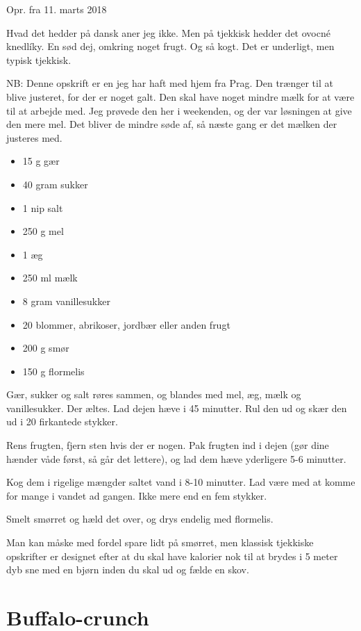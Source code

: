 \documentclass[
  letterpaper,
  DIV=11,
  numbers=noendperiod]{scrreprt}
\providecommand{\tightlist}{%
  \setlength{\itemsep}{0pt}\setlength{\parskip}{0pt}}\usepackage{longtable,booktabs,array}
\begin{document}
Opr. fra 11. marts 2018

Hvad det hedder på dansk aner jeg ikke. Men på tjekkisk hedder det
ovocné knedlíky. En sød dej, omkring noget frugt. Og så kogt. Det er
underligt, men typisk tjekkisk.

NB: Denne opskrift er en jeg har haft med hjem fra Prag. Den trænger til
at blive justeret, for der er noget galt. Den skal have noget mindre
mælk for at være til at arbejde med. Jeg prøvede den her i weekenden, og
der var løsningen at give den mere mel. Det bliver de mindre søde af, så
næste gang er det mælken der justeres med.

\begin{itemize}
\tightlist
\item
  15 g gær
\item
  40 gram sukker
\item
  1 nip salt
\item
  250 g mel
\item
  1 æg
\item
  250 ml mælk
\item
  8 gram vanillesukker
\item
  20 blommer, abrikoser, jordbær eller anden frugt
\item
  200 g smør
\item
  150 g flormelis
\end{itemize}

Gær, sukker og salt røres sammen, og blandes med mel, æg, mælk og
vanillesukker. Der æltes. Lad dejen hæve i 45 minutter. Rul den ud og
skær den ud i 20 firkantede stykker.

Rens frugten, fjern sten hvis der er nogen. Pak frugten ind i dejen (gør
dine hænder våde først, så går det lettere), og lad dem hæve yderligere
5-6 minutter.

Kog dem i rigelige mængder saltet vand i 8-10 minutter. Lad være med at
komme for mange i vandet ad gangen. Ikke mere end en fem stykker.

Smelt smørret og hæld det over, og drys endelig med flormelis.

Man kan måske med fordel spare lidt på smørret, men klassisk tjekkiske
opskrifter er designet efter at du skal have kalorier nok til at brydes
i 5 meter dyb sne med en bjørn inden du skal ud og fælde en skov.

\hypertarget{buffalo-crunch}{%
\section{Buffalo-crunch}\label{buffalo-crunch}}
\end{document}
